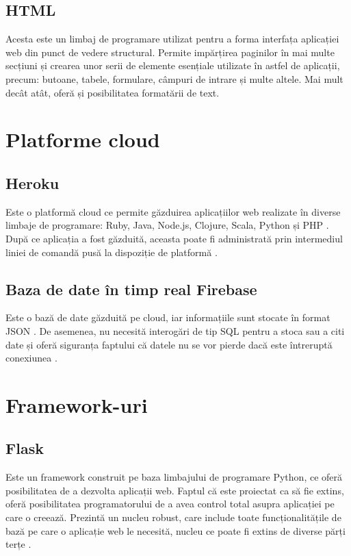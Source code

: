 \subsection{HTML}

	Acesta este un limbaj de programare utilizat pentru a forma interfața aplicației web din punct de vedere structural. Permite impărțirea paginilor în mai multe secțiuni și crearea unor serii de elemente esențiale utilizate în astfel de aplicații, precum: butoane, tabele, formulare, câmpuri de intrare și multe altele. Mai mult decât atât, oferă și posibilitatea formatării de text.  


\section{Platforme cloud}

\subsection{Heroku}

	Este o platformă cloud ce permite găzduirea aplicațiilor web realizate în diverse limbaje de programare: Ruby, Java, Node.js, Clojure, Scala, Python și PHP \cite{heroku}. După ce aplicația a fost găzduită, aceasta poate fi administrată prin intermediul liniei de comandă pusă la dispoziție de platformă \cite{heroku}.

\subsection{Baza de date în timp real Firebase}

	Este o bază de date găzduită pe cloud, iar informațiile sunt stocate în format JSON \cite{firebase}. De asemenea, nu necesită interogări de tip SQL pentru a stoca sau a citi date și oferă siguranța faptului că datele nu se vor pierde dacă este întreruptă conexiunea \cite{firebase}.

\section{Framework-uri}

\subsection{Flask}

	Este un framework construit pe baza limbajului de programare Python, ce oferă posibilitatea de a dezvolta aplicații web. Faptul că este proiectat ca să fie extins, oferă posibilitatea programatorului de a avea control total asupra aplicației pe care o creează. Prezintă un nucleu robust, care include toate funcționalitățile de bază pe care o aplicație web le necesită, nucleu ce poate fi extins de diverse părți terțe \cite{flask}.

